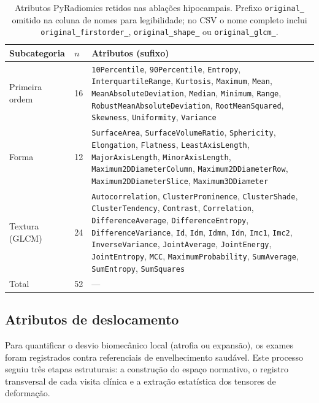 \documentclass[review]{elsarticle}
\newcommand{\code}[1]{\texttt{#1}}
\begin{document}
	\begin{table}[H]
		\centering
		\caption{Atributos PyRadiomics retidos nas ablações hipocampais. Prefixo \code{original\_} omitido na coluna de nomes para legibilidade; no CSV o nome completo inclui \code{original\_firstorder\_}, \code{original\_shape\_} ou \code{original\_glcm\_}.}
		\label{tab:pyradiomics-features}
		\small
		\begin{tabular}{@{}llp{}@{}}
			\toprule
			Subcategoria & $n$ & Atributos (sufixo) \\
			\midrule
			Primeira ordem
			& 16
			& \code{10Percentile}, \code{90Percentile}, \code{Entropy}, \code{InterquartileRange},
			\code{Kurtosis}, \code{Maximum}, \code{Mean}, \code{MeanAbsoluteDeviation},
			\code{Median}, \code{Minimum}, \code{Range}, \code{RobustMeanAbsoluteDeviation},
			\code{RootMeanSquared}, \code{Skewness}, \code{Uniformity}, \code{Variance} \\
			\addlinespace
			Forma
			& 12
			& \code{SurfaceArea}, \code{SurfaceVolumeRatio}, \code{Sphericity}, \code{Elongation},
			\code{Flatness}, \code{LeastAxisLength}, \code{MajorAxisLength}, \code{MinorAxisLength},
			\code{Maximum2DDiameterColumn}, \code{Maximum2DDiameterRow},
			\code{Maximum2DDiameterSlice}, \code{Maximum3DDiameter} \\
			\addlinespace
			Textura (GLCM)
			& 24
			& \code{Autocorrelation}, \code{ClusterProminence}, \code{ClusterShade},
			\code{ClusterTendency}, \code{Contrast}, \code{Correlation},
			\code{DifferenceAverage}, \code{DifferenceEntropy}, \code{DifferenceVariance},
			\code{Id}, \code{Idm}, \code{Idmn}, \code{Idn}, \code{Imc1}, \code{Imc2},
			\code{InverseVariance}, \code{JointAverage}, \code{JointEnergy},
			\code{JointEntropy}, \code{MCC}, \code{MaximumProbability},
			\code{SumAverage}, \code{SumEntropy}, \code{SumSquares} \\
			\midrule
			Total
			& 52
			& --- \\
			\bottomrule
		\end{tabular}
	\end{table}
	\subsection{Atributos de deslocamento}
	Para quantificar o desvio biomecânico local (atrofia ou expansão), os exames foram registrados contra referenciais de envelhecimento saudável. Este processo seguiu três etapas estruturais: a construção do espaço normativo, o registro transversal de cada visita clínica e a extração estatística dos tensores de deformação.
	
\end{document}
